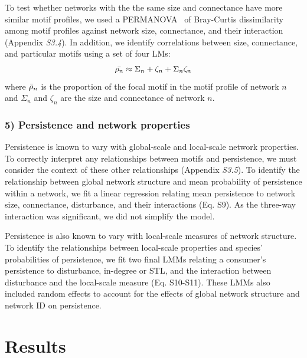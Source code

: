 \documentclass[12pt]{article}
\begin{document}
\begin{spacing}{2.0}
        To test whether networks with the the same size and connectance have more similar motif profiles, we used a PERMANOVA~\citep{Anderson2001} of Bray-Curtis dissimilarity among motif profiles against network size, connectance, and their interaction (Appendix \emph{S3.4}). 
        In addition, we identify correlations between size, connectance, and particular motifs using a set of four LMs:
        \begin{equation}
            \Bar{\rho_{n}} \approx \Sigma_{n} + \zeta_{n} + \Sigma_{n}\zeta_{n}
        \label{profile_global}
        \end{equation}
        \noindent where $\Bar{\rho}_{n}$ is the proportion of the focal motif in the motif profile of network $n$ and $\Sigma_n$ and $\zeta_{n}$ are the size and connectance of network $n$.
        
    \subsubsection*{5) Persistence and network properties}
        
        Persistence is known to vary with global-scale and local-scale network properties.
        To correctly interpret any relationships between motifs and persistence, we must consider the context of these other relationships (Appendix \emph{S3.5}).
        To identify the relationship between global network structure and mean probability of persistence within a network, we fit a linear regression relating mean persistence to network size, connectance, disturbance, and their interactions (Eq. S9).
        As the three-way interaction was significant, we did not simplify the model. 


        Persistence is also known to vary with local-scale measures of network structure. 
        To identify the relationships between local-scale properties and species' probabilities of persistence, we fit two final LMMs relating a consumer's persistence to disturbance, in-degree or STL, and the interaction between disturbance and the local-scale measure (Eq. S10-S11).
        These LMMs also included random effects to account for the effects of global network structure and network ID on persistence.


\section*{Results}


\end{spacing}
\end{document}
